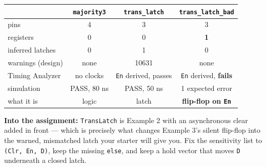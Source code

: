 \documentclass[11pt]{article}
\newcommand{\code}[1]{\texttt{#1}}
\begin{document}
\begin{center}
\begin{tabular}{lccc}
\toprule
& \code{majority3} & \code{trans\_latch} & \code{trans\_latch\_bad} \\
\midrule
pins & 4 & 3 & 3 \\
registers & 0 & 0 & \textbf{1} \\
inferred latches & 0 & 1 & 0 \\
warnings (design) & none & 10631 & none \\
Timing Analyzer & no clocks & \code{En} derived, passes & \code{En} derived, \textbf{fails} \\
simulation & PASS, 80 ns & PASS, 50 ns & 1 expected error \\
what it is & logic & latch & \textbf{flip-flop on \code{En}} \\
\bottomrule
\end{tabular}
\end{center}

\textbf{Into the assignment:} \code{TransLatch} is Example 2 with an asynchronous
clear added in front --- which is precisely what changes Example 3's silent flip-flop
into the warned, mismatched latch your starter will give you. Fix the sensitivity
list to \code{(Clr, En, D)}, keep the missing \code{else}, and keep a hold vector
that moves \code{D} underneath a closed latch.
\end{document}
